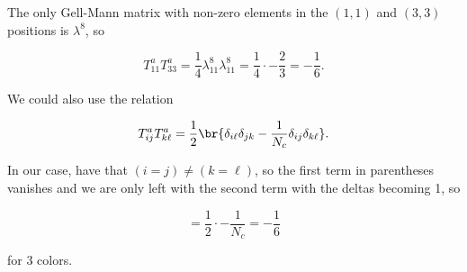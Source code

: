 \section{}

The only Gell-Mann matrix with non-zero elements in the $(1,1)$ and $(3,3)$ positions is $\lambda^8$, so

\begin{equation}
  T^a_{11}T^a_{33} = \frac{1}{4}\lambda^8_{11}\lambda^8_{11} = \frac{1}{4} \cdot - \frac{2}{3} = -\frac{1}{6}.
\end{equation}

We could also use the relation

\begin{equation}
  T^a_{ij}T^a_{k\ell} = \frac{1}{2}\br{\delta_{i\ell}\delta_{jk} - \frac{1}{N_c}\delta_{ij}\delta_{k\ell}}.
\end{equation}

In our case, have that $(i=j) \neq (k=\ell)$, so the first term in parentheses vanishes and we are only left with the second term with the deltas becoming 1, so

\begin{equation}
  = \frac{1}{2} \cdot - \frac{1}{N_c} = - \frac{1}{6}
\end{equation}

for $3$ colors.

